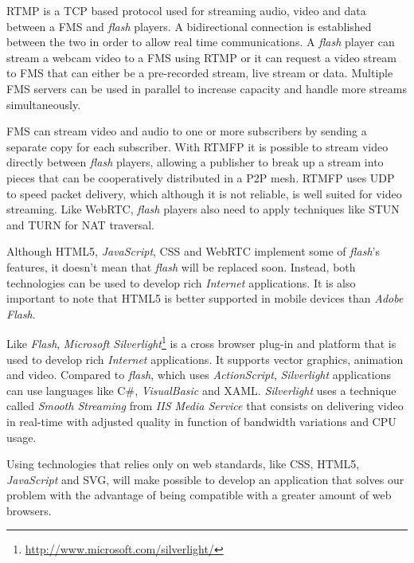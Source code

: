   \ac{RTMP} is a \ac{TCP} based protocol used for streaming audio, video and data between a \ac{FMS} and \emph{flash} players. A bidirectional connection is established between the two in order to allow real time communications. A \emph{flash} player can stream a webcam video to a \ac{FMS} using \ac{RTMP} or it can request a video stream to \ac{FMS} that can either be a pre-recorded stream, live stream or data. Multiple \ac{FMS} servers can be used in parallel to increase capacity and handle more streams simultaneously.

  \ac{FMS} can stream video and audio to one or more subscribers by sending a separate copy for each subscriber. With \ac{RTMFP} it is possible to stream video directly between \emph{flash} players, allowing a publisher to break up a stream into pieces that can be cooperatively distributed in a P2P mesh. \ac{RTMFP} uses \ac{UDP} to speed packet delivery, which although it is not reliable, is well suited for video streaming. Like \ac{WebRTC}, \emph{flash} players also need to apply techniques like \ac{STUN} and \ac{TURN} for \ac{NAT} traversal.

  Although \ac{HTML}5, \emph{JavaScript}, \ac{CSS} and \ac{WebRTC} implement some of \emph{flash}'s features, it doesn't mean that \emph{flash} will be replaced soon.
  Instead, both technologies can be used to develop rich \emph{Internet} applications.
  It is also important to note that \ac{HTML}5 is better supported in mobile devices than \emph{Adobe Flash}. 

  Like \emph{Flash}, \emph{Microsoft Silverlight}\footnote{\url{http://www.microsoft.com/silverlight/}} is a cross browser plug-in and platform that is used to develop rich \emph{Internet} applications. It supports vector graphics, animation and video. Compared to \emph{flash}, which uses \emph{ActionScript}, \emph{Silverlight} applications can use languages like C\#, \emph{VisualBasic} and \ac{XAML}. \emph{Silverlight} uses a technique called \emph{Smooth Streaming} from \emph{IIS Media Service} that consists on delivering video in real-time with adjusted quality in function of bandwidth variations and \ac{CPU} usage.

  Using technologies that relies only on web standards, like \ac{CSS}, \ac{HTML}5, \emph{JavaScript} and \ac{SVG}, will make possible to develop an application that solves our problem with the advantage of being compatible with a greater amount of web browsers.


